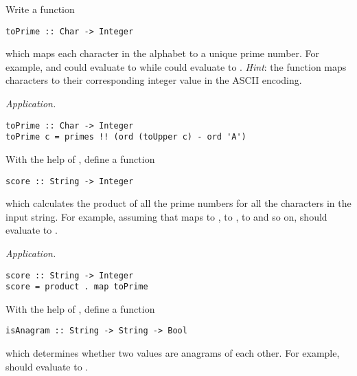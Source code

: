 \begin{parts}
    \begin{subparts}
        \subpart[4] Write a function 
        \vspace*{0.2cm}
        \begin{verbatim}
toPrime :: Char -> Integer
        \end{verbatim}
        \vspace*{0.2cm}
        which maps each character in the alphabet to a unique prime number. For example,  and  could evaluate to  while  could evaluate to . \emph{Hint}: the  function maps characters to their corresponding integer value in the ASCII encoding.  \droppoints 
        
        \begin{solution}
            \emph{Application.} 
            \begin{verbatim}
toPrime :: Char -> Integer
toPrime c = primes !! (ord (toUpper c) - ord 'A')
            \end{verbatim}
        \end{solution}
        
        \subpart[3] With the help of , define a function
        \vspace*{0.2cm}
        \begin{verbatim}
score :: String -> Integer
        \end{verbatim}
        \vspace*{0.2cm}
        which calculates the product of all the prime numbers for all the characters in the input string. For example, assuming that  maps  to ,  to ,  to  and so on,  should evaluate to . \droppoints 
        
        \begin{solution}
            \emph{Application.} 
            \begin{verbatim}
score :: String -> Integer
score = product . map toPrime
            \end{verbatim}
        \end{solution}
    
        \subpart[2] With the help of , define a function 
        \vspace*{0.2cm}
        \begin{verbatim}
isAnagram :: String -> String -> Bool
        \end{verbatim}
        \vspace*{0.2cm}	    
        which determines whether two  values are anagrams of each other. For example,  should evaluate to . \droppoints 
    

\end{subparts}
\end{parts}
